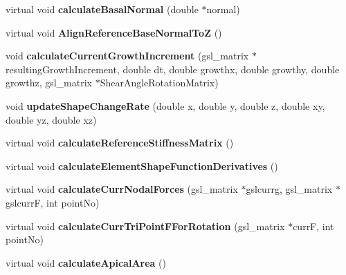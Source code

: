 \begin{DoxyCompactItemize}
\item 
\hypertarget{classShapeBase_ae7c003e9b98e31d04275ffb45709c9fa}{}virtual void {\bfseries calculate\+Basal\+Normal} (double $\ast$normal)\label{classShapeBase_ae7c003e9b98e31d04275ffb45709c9fa}

\item 
\hypertarget{classShapeBase_a362a15361e6fd25d65ed05f0cc31737a}{}virtual void {\bfseries Align\+Reference\+Base\+Normal\+To\+Z} ()\label{classShapeBase_a362a15361e6fd25d65ed05f0cc31737a}

\item 
\hypertarget{classShapeBase_ac2c05f660fb3d68482c8ba751b68b2ed}{}void {\bfseries calculate\+Current\+Growth\+Increment} (gsl\+\_\+matrix $\ast$resulting\+Growth\+Increment, double dt, double growthx, double growthy, double growthz, gsl\+\_\+matrix $\ast$Shear\+Angle\+Rotation\+Matrix)\label{classShapeBase_ac2c05f660fb3d68482c8ba751b68b2ed}

\item 
\hypertarget{classShapeBase_a227d409b04d95e3110db851a9cb3ed8c}{}void {\bfseries update\+Shape\+Change\+Rate} (double x, double y, double z, double xy, double yz, double xz)\label{classShapeBase_a227d409b04d95e3110db851a9cb3ed8c}

\item 
\hypertarget{classShapeBase_a1162e815f80b1b9d58c69df731702ecb}{}virtual void {\bfseries calculate\+Reference\+Stiffness\+Matrix} ()\label{classShapeBase_a1162e815f80b1b9d58c69df731702ecb}

\item 
\hypertarget{classShapeBase_ab86b6c4eef2ea6232dd1d0c300ae5602}{}virtual void {\bfseries calculate\+Element\+Shape\+Function\+Derivatives} ()\label{classShapeBase_ab86b6c4eef2ea6232dd1d0c300ae5602}

\item 
\hypertarget{classShapeBase_afc2e2e90a9352778ba6bf6d547e319bf}{}virtual void {\bfseries calculate\+Curr\+Nodal\+Forces} (gsl\+\_\+matrix $\ast$gslcurrg, gsl\+\_\+matrix $\ast$gslcurr\+F, int point\+No)\label{classShapeBase_afc2e2e90a9352778ba6bf6d547e319bf}

\item 
\hypertarget{classShapeBase_a146919562543c6f08d34cf1ae3e54a51}{}virtual void {\bfseries calculate\+Curr\+Tri\+Point\+F\+For\+Rotation} (gsl\+\_\+matrix $\ast$curr\+F, int point\+No)\label{classShapeBase_a146919562543c6f08d34cf1ae3e54a51}

\item 
\hypertarget{classShapeBase_a010092ac7af5667facbbb8fb6bd98976}{}virtual void {\bfseries calculate\+Apical\+Area} ()\label{classShapeBase_a010092ac7af5667facbbb8fb6bd98976}


\end{DoxyCompactItemize}
